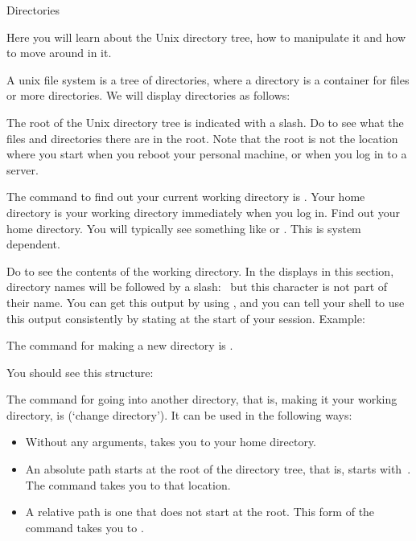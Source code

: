  {Directories}

\begin{purpose}
  Here you will learn about the Unix directory tree, how to manipulate
  it and how to move around in it.
\end{purpose}

A unix file system is a tree of directories, where a directory is a
container for files or more directories. We will display directories
as follows:


The root of the Unix directory tree is indicated with a slash. Do
 to see what the files and directories there are in the
root. Note that the root is not the location where you start when you
reboot your personal machine, or when you log in to a server.

\practical
{The command to find out your current working directory
is . Your home directory is your working directory immediately
when you log in. Find out your home directory.}
{You will typically see something like  or
  . This is system dependent.}{}

Do  to see the contents of the working directory. In the
displays in this section, directory names will be followed by a
slash:~ but this character is not part of their name.  You can
get this output by using , and you can tell your shell to
use this output consistently by stating  at the start of your
session. Example:


The command for making a new directory is .

{You should see this structure:
}{}

The command for going into another directory, that is, making it your
working directory, is  (`change directory'). It can be used in
the following ways:
\begin{itemize}
\item {} Without any arguments,  takes you to your home directory.
\item {} An absolute path starts at the root of
  the directory tree, that is, starts with~\n{/}. The  command
  takes you to that location.
\item {} A relative path is one that does not
  start at the root. This form of the  command takes you to
  .
\end{itemize}

